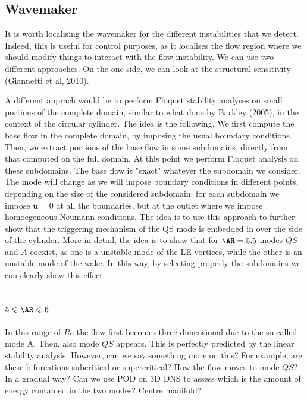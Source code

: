 \documentclass{jfm}
\begin{document}
\subsection{Wavemaker}

It is worth localising the wavemaker for the different instabilities that we detect. Indeed, this is useful for control purposes, as it localises the flow region where we should modify things to interact with the flow instability. We can use two different approaches. On the one side, we can look at the structural sensitivity (Giannetti et al, 2010). 

A different apprach would be to perform Floquet stability analyses on small portions of the complete domain, similar to what done by Barkley (2005), in the context of the circular cylinder. The idea is the following. We first compute the base flow in the complete domain, by imposing the usual boundary conditions. Then, we extract portions of the base flow in some subdomains, directly from that computed on the full domain. At this point we perform Floquet analysis on these subdomains. The base flow is "exact" whatever the subdomain we consider. The mode will change as we will impose boundary conditions in different points, depending on the size of the considered subdomain: for each subdomain we impose $\bm{u}=0$ at all the boundaries, but at the outlet where we impose homoegeneous Neumann conditions. The idea is to use this approach to further show that the triggering mechanism of the QS mode is embedded in over the side of the cylinder. More in detail, the idea is to show that for $\AR=5.5$ modes $QS$ and $A$ coexist, as one is a unstable mode of the LE vortices, while the other is an unstable mode of the wake. In this way, by selecting properly the subdomains we can clearly show this effect.


\subsection{$5 \le \AR \le 6$}

In this range of $Re$ the flow first becomes three-dimensional due to the so-called mode A. Then, also mode $QS$ appears. This is perfectly predicted by the linear stability analysis. However, can we say something more on this? For example, are these bifurcations subcritical or supercritical? How the flow moves to mode $QS$? In a gradual way? Can we use POD on 3D DNS to assess which is the amount of energy contained in the two modes? Centre manifold?
\end{document}
